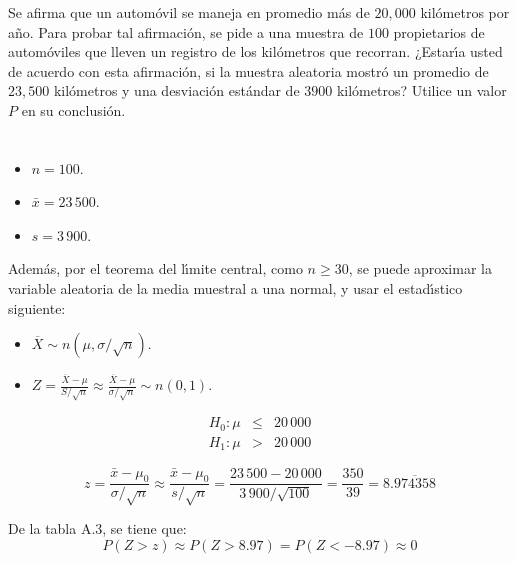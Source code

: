 \begin{enunciado}
 Se afirma que un autom\'ovil se maneja en promedio m\'as de $20,000$ kil\'ometros por a\~no. Para probar tal afirmaci\'on, se pide a una muestra de $100$ propietarios de autom\'oviles que lleven un registro de los kil\'ometros que recorran. ¿Estar\'{\i}a usted de acuerdo con esta afirmaci\'on, si la muestra aleatoria mostr\'o un promedio de $23,500$ kil\'ometros y una desviaci\'on est\'andar de $3900$ kil\'ometros? Utilice un valor $P$ en su conclusi\'on.
\end{enunciado}

\begin{solucion}
 \begin{datos}
  $\phantom{0}$
  \begin{itemize}
   \item $n=100$.
   \item $\bar{x} = 23\,500$.
   \item $s = 3\,900$.
  \end{itemize}
  Adem\'as, por el teorema del l\'{\i}mite central, como $n \geq 30$, se puede aproximar la variable aleatoria de la media muestral a una normal, y usar el estad\'{\i}stico siguiente:
  \begin{itemize}
   \item $\overline{X} \sim n\left( \mu , \sigma/\sqrt{n} \right)$.
   \item $Z = \frac{\overline{X}-\mu}{S/\sqrt{n}} \approx
   \frac{\overline{X} - \mu}{\sigma/\sqrt{n}} \sim n(0,1)$.
  \end{itemize}
 \end{datos}

 \begin{hipotesis}
  \begin{eqnarray*}
   H_0: \mu & \leq & 20\,000 \\
   H_1: \mu & > & 20\,000
  \end{eqnarray*}
 \end{hipotesis}

 \begin{estadistico}
  \begin{equation*}
   z = \frac{\bar{x} - \mu_0}{\sigma/\sqrt{n}} \approx \frac{\bar{x} - \mu_0}{s/\sqrt{n}} = \frac{23\,500 - 20\,000}{3\,900/\sqrt{100}} = \frac{350}{39} = 8.\overline{974358}
  \end{equation*}
 \end{estadistico}

 \begin{valorp}
  De la tabla A.3, se tiene que:
  \begin{equation*}
   P\left( Z > z \right) \approx P(Z > 8.97) = P(Z < -8.97) \approx 0
  \end{equation*}
 \end{valorp}


\end{solucion}
